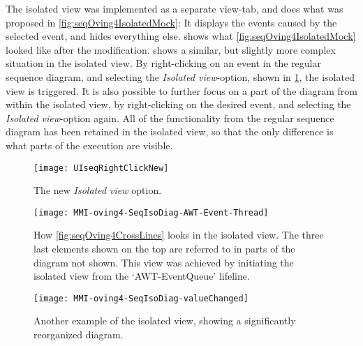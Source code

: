 The isolated view was implemented as a separate view-tab, and does what was proposed in \cref{fig:seqOving4IsolatedMock}: It displays the events caused by the selected event, and hides everything else.
 shows what \cref{fig:seqOving4IsolatedMock} looked like after the modification.
 shows a similar, but slightly more complex situation in the isolated view.
By right-clicking on an event in the regular sequence diagram, and selecting the \emph{Isolated view}-option, shown in \cref{fig:UISeqRightClickNew}, the isolated view is triggered.
It is also possible to further focus on a part of the diagram from within the isolated view, by right-clicking on the desired event, and selecting the \emph{Isolated view}-option again.
All of the functionality from the regular sequence diagram has been retained in the isolated view, so that the only difference is what parts of the execution are visible.
\begin{figure}[H]
	\centering
	\texttt{[image: UIseqRightClickNew]}
	\caption{The new \emph{Isolated view} option.}
	\label{fig:UISeqRightClickNew}
\end{figure}

\begin{figure}[H]
	\centering
	\texttt{[image: MMI-oving4-SeqIsoDiag-AWT-Event-Thread]}
	\caption[How \cref{fig:seqOving4CrossLines} looks in the isolated view.]{How \cref{fig:seqOving4CrossLines} looks in the isolated view. The three last elements shown on the top are referred to in parts of the diagram not shown. This view was achieved by initiating the isolated view from the `AWT-EventQueue' lifeline.}
	\label{fig:MMI-oving4-SeqIsoDiag-AWT-Event-Thread}
\end{figure}

\begin{figure}[H]
	\centering
	\texttt{[image: MMI-oving4-SeqIsoDiag-valueChanged]}
	\caption{Another example of the isolated view, showing a significantly reorganized diagram.}
	\label{fig:MMI-oving4-SeqIsoDiag-valueChanged}
\end{figure}

